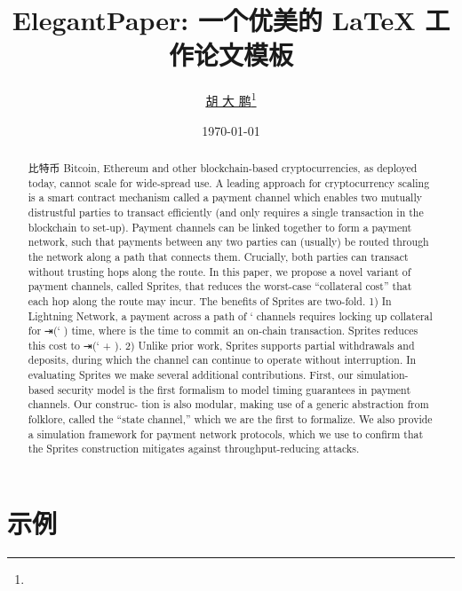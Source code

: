 \documentclass[lang=cn]{elegantpaper}
\title{ElegantPaper: 一个优美的 \LaTeX{} 工作论文模板}
\author{\href{https://github.com/dapenghu}{胡 大 鹏}\thanks{}}
\institute{OK区块链工程院}
\date{\today}
\begin{document}
\maketitle

\begin{abstract}

\noindent 比特币 Bitcoin, Ethereum and other blockchain-based cryptocurrencies, as deployed today, cannot scale for wide-spread use. A leading approach for cryptocurrency scaling is a smart contract mechanism called a payment channel which enables two mutually distrustful parties to transact efficiently (and only requires a single transaction in the blockchain to set-up). 
Payment channels can be linked together to form a payment network, such that payments between any two parties can (usually) be routed through the network along a path that connects them. Crucially, both parties can transact without trusting hops along the route.
In this paper, we propose a novel variant of payment channels, called Sprites, that reduces the worst-case “collateral cost” that each hop along the route may incur. The benefits of Sprites are two-fold. 
1) In Lightning Network, a payment across a path of ` channels requires locking up collateral for ⇥(` ) time, where   is the time to commit an on-chain transaction. Sprites reduces this cost to ⇥(` +  ). 
2) Unlike prior work, Sprites supports partial withdrawals and deposits, during which the channel can continue to operate without interruption.
In evaluating Sprites we make several additional contributions. First, our simulation-based security model is the first formalism to model timing guarantees in payment channels. Our construc- tion is also modular, making use of a generic abstraction from folklore, called the “state channel,” which we are the first to formalize. We also provide a simulation framework for payment network protocols, which we use to confirm that the Sprites construction mitigates against throughput-reducing attacks.

\end{abstract}

\section{示例}


\end{document}
